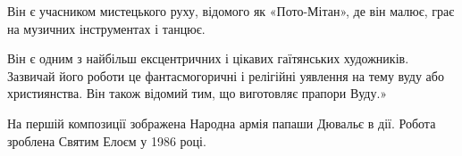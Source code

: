 
Він є учасником мистецького руху, відомого як «Пото-Мітан», де він малює, грає
на музичних інструментах і танцює. 


Він є одним з найбільш ексцентричних і цікавих гаїтянських художників. Зазвичай
його роботи це фантасмогоричні і релігійні уявлення на тему вуду або
християнства. Він також відомий тим, що виготовляє прапори Вуду.»

На першій композиції зображена Народна армія папаши Дювальє в дії. Робота
зроблена Святим Елоєм у 1986 році.

